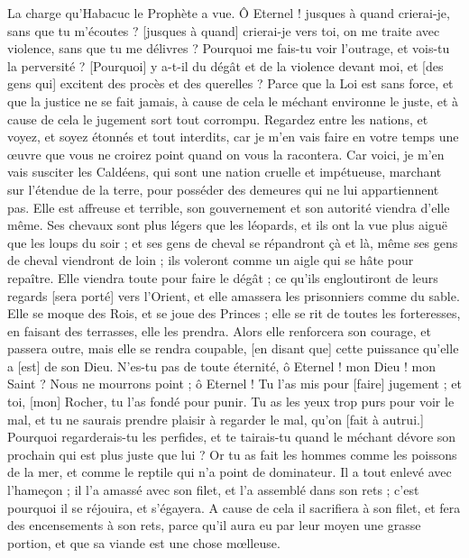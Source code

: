 \BFont
\begin{multicols}{2}
\VerseOne{}La charge qu'Habacuc le Prophète a vue.
Ô Eternel ! jusques à quand crierai-je, sans que tu m'écoutes ? [jusques à quand] crierai-je vers toi, on me traite avec violence, sans que tu me délivres ?
Pourquoi me fais-tu voir l'outrage, et vois-tu la perversité ? [Pourquoi] y a-t-il du dégât et de la violence devant moi, et [des gens qui] excitent des procès et des querelles ?
Parce que la Loi est sans force, et que la justice ne se fait jamais, à cause de cela le méchant environne le juste, et à cause de cela le jugement sort tout corrompu.
Regardez entre les nations, et voyez, et soyez étonnés et tout interdits, car je m'en vais faire en votre temps une œuvre que vous ne croirez point quand on vous la racontera.
Car voici, je m'en vais susciter les Caldéens, qui sont une nation cruelle et impétueuse, marchant sur l'étendue de la terre, pour posséder des demeures qui ne lui appartiennent pas.
Elle est affreuse et terrible, son gouvernement et son autorité viendra d'elle même.
Ses chevaux sont plus légers que les léopards, et ils ont la vue plus aiguë que les loups du soir ; et ses gens de cheval se répandront çà et là, même ses gens de cheval viendront de loin ; ils voleront comme un aigle qui se hâte pour repaître.
Elle viendra toute pour faire le dégât ; ce qu'ils engloutiront de leurs regards [sera porté] vers l'Orient, et elle amassera les prisonniers comme du sable.
Elle se moque des Rois, et se joue des Princes ; elle se rit de toutes les forteresses, en faisant des terrasses, elle les prendra.
Alors elle renforcera son courage, et passera outre, mais elle se rendra coupable, [en disant que] cette puissance qu'elle a [est] de son Dieu.
N'es-tu pas de toute éternité, ô Eternel ! mon Dieu ! mon Saint ? Nous ne mourrons point ; ô Eternel ! Tu l'as mis pour [faire] jugement ; et toi, [mon] Rocher, tu l'as fondé pour punir.
Tu as les yeux trop purs pour voir le mal, et tu ne saurais prendre plaisir à regarder le mal, qu'on [fait à autrui.] Pourquoi regarderais-tu les perfides, et te tairais-tu quand le méchant dévore son prochain qui est plus juste que lui ?
Or tu as fait les hommes comme les poissons de la mer, et comme le reptile qui n'a point de dominateur.
Il a tout enlevé avec l'hameçon ; il l'a amassé avec son filet, et l'a assemblé dans son rets ; c'est pourquoi il se réjouira, et s'égayera.
A cause de cela il sacrifiera à son filet, et fera des encensements à son rets, parce qu'il aura eu par leur moyen une grasse portion, et que sa viande est une chose mœlleuse.

\end{multicols}
